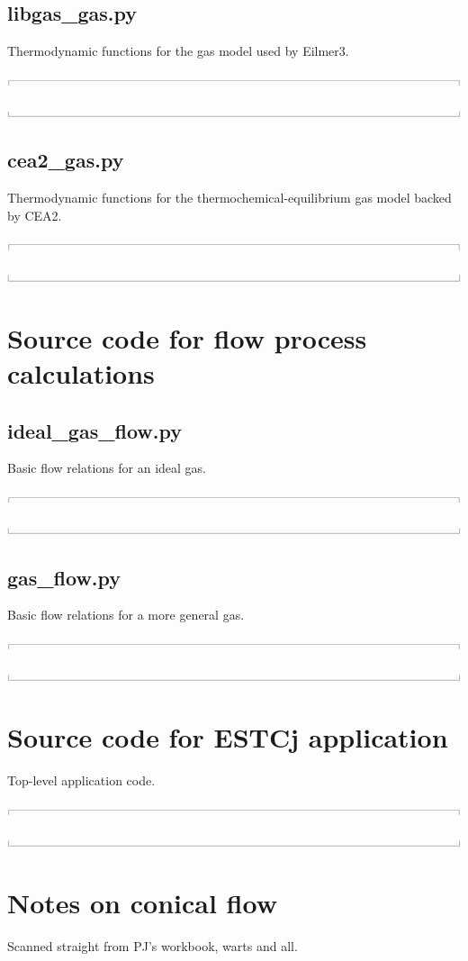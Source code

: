 \documentclass[10pt,a4paper]{article}
\newcommand{\topbar}{\ensuremath{
    \rule{0.1mm}{2.0mm} \rule[2.0mm]{159.5mm}{0.1mm} \rule{0.1mm}{2.0mm}
}}
\newcommand{\bottombar}{\ensuremath{
    \rule{0.1mm}{2.0mm} \rule{159.5mm}{0.1mm} \rule{0.1mm}{2.0mm}
}}
\begin{document}
\newpage
\subsection{libgas\_gas.py}
\label{libgas-gas-py}
%
Thermodynamic functions for the gas model used by Eilmer3.

\noindent\topbar

\bottombar

\newpage
\subsection{cea2\_gas.py}
\label{cea2-gas-py}
%
Thermodynamic functions for the thermochemical-equilibrium gas model backed by CEA2.

\noindent\topbar

\bottombar

\newpage
\section{Source code for flow process calculations}
%
\subsection{ideal\_gas\_flow.py}
\label{ideal-gas-flow-py}
%
Basic flow relations for an ideal gas.

\noindent\topbar

\bottombar

\newpage
\subsection{gas\_flow.py}
\label{gas-flow-py}
%
Basic flow relations for a more general gas.

\noindent\topbar

\bottombar

\newpage
\section{Source code for ESTCj application}
\label{estcj-py}
%
Top-level application code.

\noindent\topbar

\bottombar

\newpage
\section{Notes on conical flow}
\label{pj-notes-cone-flow}
%
Scanned straight from PJ's workbook, warts and all.
\end{document}
